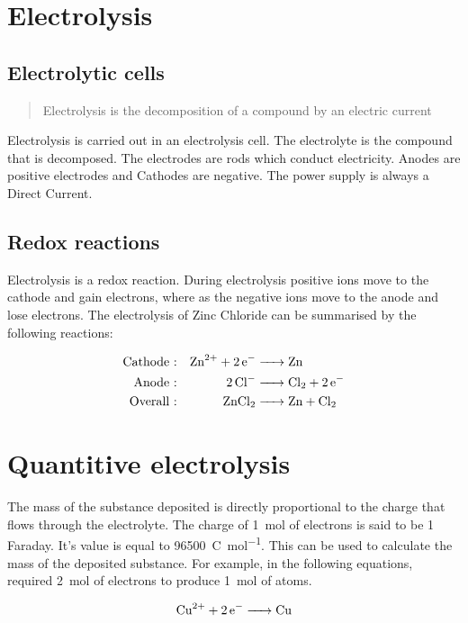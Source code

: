 \documentclass{scrbook}
\begin{document}
\section{Electrolysis}

\subsection{Electrolytic cells}

	\begin{quote}
		Electrolysis is the decomposition of a compound by an electric current
	\end{quote}

	Electrolysis is carried out in an electrolysis cell. The electrolyte is the compound that is decomposed. The electrodes are rods which conduct electricity. Anodes are positive electrodes and Cathodes are negative. The power supply is always a Direct Current.

\subsection{Redox reactions}

	Electrolysis is a redox reaction. During electrolysis positive ions move to the cathode and gain electrons, where as the negative ions move to the anode and lose electrons. The electrolysis of Zinc Chloride can be summarised by the following reactions:

	\begin{align*}
		\text{Cathode :} && \ce{Zn^{2+} + 2e- &-> Zn} \\
		\text{Anode :} && \ce{2Cl- &-> Cl2 + 2e-} \\
		\text{Overall :} && \ce{ZnCl2 &-> Zn + Cl2}
	\end{align*}

\section{Quantitive electrolysis}

	The mass of the substance deposited is directly proportional to the charge that flows through the electrolyte. The charge of \SI{1}{\mole} of electrons is said to be 1 Faraday. It's value is equal to \SI{96500}{\coulomb\per\mole}. This can be used to calculate the mass of the deposited substance. For example, in the following equations,  required \SI{2}{\mole} of electrons to produce \SI{1}{\mole} of  atoms.

	\[ \ce{Cu^{2+} +2e- -> Cu} \]
\end{document}
